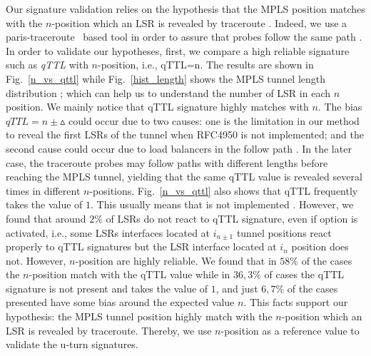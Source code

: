 Our signature validation relies on the hypothesis that the MPLS position matches
with the $n$-position  which an LSR is revealed by traceroute .
Indeed, we use a paris-traceroute~\cite{BRICE06}  based tool in order to assure
that probes follow the same path .
In order to validate our hypotheses, first, we compare a high reliable signature
such as \textit{qTTL} with  $n$-position, i.e., qTTL=n. The results are shown in
Fig.~\ref{n_vs_qttl} while Fig.~\ref{hist_length} shows the MPLS tunnel length
distribution ; which can help us to understand the number of LSR in each $n$
position.
We mainly notice that qTTL signature highly matches with $n$.
The bias $\textit{qTTL}=n \pm \vartriangle $ could occur due to two causes: one
is the limitation in our method to reveal the first LSRs  of the tunnel when RFC4950 is not implemented; and the second cause could
occur due to load balancers in the follow path . In the later
case, the traceroute probes may follow paths with different lengths before
reaching the MPLS tunnel, yielding that the same qTTL value is revealed several
times in different $n$-positions. Fig.~\ref{n_vs_qttl} also shows that qTTL
frequently takes the value of $1$. This usually  means that \tpropagate is not
implemented . However, we
found that around $2\%$ of LSRs do not react to qTTL signature, even if
\tpropagate option is activated, i.e., some LSRs interfaces located at $i_{n\pm
1}$ tunnel positions react properly to qTTL signatures but the LSR interface
located at $i_n$ position does not. However, $n$-position are highly reliable.
We found that in $58\%$ of the cases the $n$-position match with the qTTL value
while in $36,3\%$ of cases the qTTL signature is not present and takes the value
of $1$, and just $6,7\%$ of the cases presented have some bias around the
expected value $n$. This facts support our hypothesis: the  MPLS tunnel position
highly match with the $n$-position  which an LSR is revealed by traceroute.
Thereby,  we use $n$-position as a reference value to validate the u-turn
signatures.

